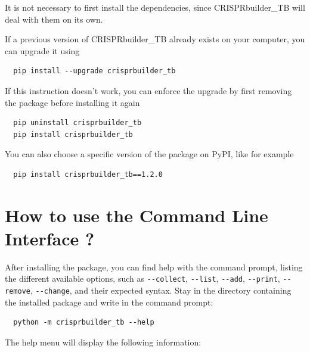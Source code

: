 \documentclass[twoside,a4paper,11pt,frenchb,openany]{report}
\begin{document}
 It is not necessary to first install the dependencies, since CRISPRbuilder\_TB will deal with them on its own.

If a previous version of CRISPRbuilder\_TB already exists on your computer, you can upgrade it using 

\begin{verbatim}
  pip install --upgrade crisprbuilder_tb
\end{verbatim}

If this instruction doesn't work, you can enforce the upgrade by first removing the package before installing it again

\begin{verbatim}
  pip uninstall crisprbuilder_tb
  pip install crisprbuilder_tb
\end{verbatim}

You can also choose a specific version of the package on PyPI, like for example

\begin{verbatim}
  pip install crisprbuilder_tb==1.2.0
\end{verbatim}



    \section*{How to use the Command Line Interface
?}\label{how-to-use-the-command-line-interface}

    After installing the package, you can find help with the command prompt,
listing the different available options, such as \texttt{-\/-collect},
\texttt{-\/-list}, \texttt{-\/-add}, \texttt{-\/-print},
\texttt{-\/-remove}, \texttt{-\/-change}, and their expected syntax.
Stay in the directory containing the installed package and write in the
command prompt:

    \begin{verbatim}
  python -m crisprbuilder_tb --help
\end{verbatim}

    The help menu will display the following information:
\end{document}
